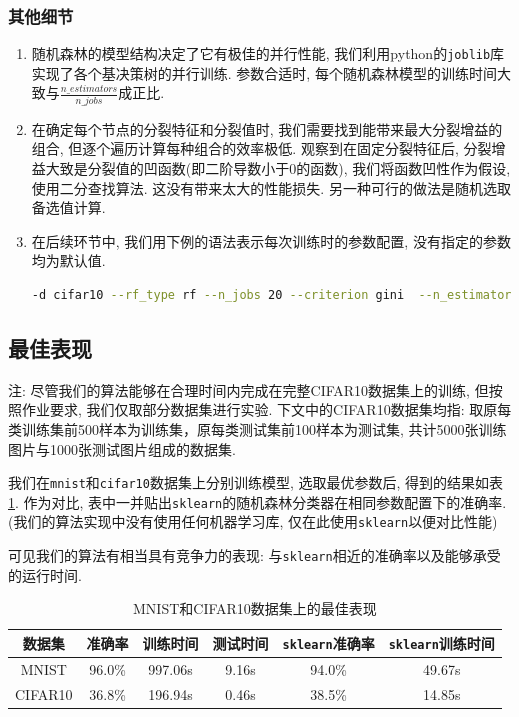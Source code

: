 \documentclass[a4paper]{article}
\begin{document}
\subsubsection{其他细节}
\begin{enumerate}
    \item 随机森林的模型结构决定了它有极佳的并行性能, 我们利用python的\texttt{joblib}库实现了各个基决策树的并行训练. 参数合适时, 每个随机森林模型的训练时间大致与$\frac{n\_estimators}{n\_jobs}$成正比.
    \item 在确定每个节点的分裂特征和分裂值时, 我们需要找到能带来最大分裂增益的组合,  但逐个遍历计算每种组合的效率极低. 观察到在固定分裂特征后, 分裂增益大致是分裂值的凹函数(即二阶导数小于0的函数), 我们将函数凹性作为假设, 使用二分查找算法. 这没有带来太大的性能损失. 另一种可行的做法是随机选取备选值计算.
    \item 在后续环节中, 我们用下例的语法表示每次训练时的参数配置, 没有指定的参数均为默认值. 
    \begin{lstlisting}[language=bash]
  -d cifar10 --rf_type rf --n_jobs 20 --criterion gini  --n_estimators 55 --max_depth 30 --min_samples_split 2 --min_samples_leaf 10 --min_impurity_decrease 1e-7
\end{lstlisting}
\end{enumerate}

\subsection{最佳表现}\label{sec:best_rf}
注: 尽管我们的算法能够在合理时间内完成在完整CIFAR10数据集上的训练, 但按照作业要求, 我们仅取部分数据集进行实验. 下文中的CIFAR10数据集均指: 取原每类训练集前500样本为训练集，原每类测试集前100样本为测试集, 共计5000张训练图片与1000张测试图片组成的数据集.

我们在\texttt{mnist}和\texttt{cifar10}数据集上分别训练模型, 选取最优参数后, 得到的结果如表\ref{table_rf_perf}. 作为对比, 表中一并贴出\texttt{sklearn}的随机森林分类器在相同参数配置下的准确率. (我们的算法实现中没有使用任何机器学习库, 仅在此使用\texttt{sklearn}以便对比性能)

可见我们的算法有相当具有竞争力的表现: 与\texttt{sklearn}相近的准确率以及能够承受的运行时间.

\begin{table}[ht]
\centering
\caption{MNIST和CIFAR10数据集上的最佳表现}
\label{table1}
\begin{tabular}{|c|c|c|c|c|c|}
\hline
数据集 &准确率&训练时间&测试时间& \texttt{sklearn}准确率& \texttt{sklearn}训练时间\\
\hline
MNIST & 96.0\%  &997.06s & 9.16s &94.0\%& 49.67s \\
CIFAR10&36.8\%  &196.94s & 0.46s &38.5\%& 14.85s\\
\hline
\end{tabular}
\label{table_rf_perf}
\end{table}
\end{document}
